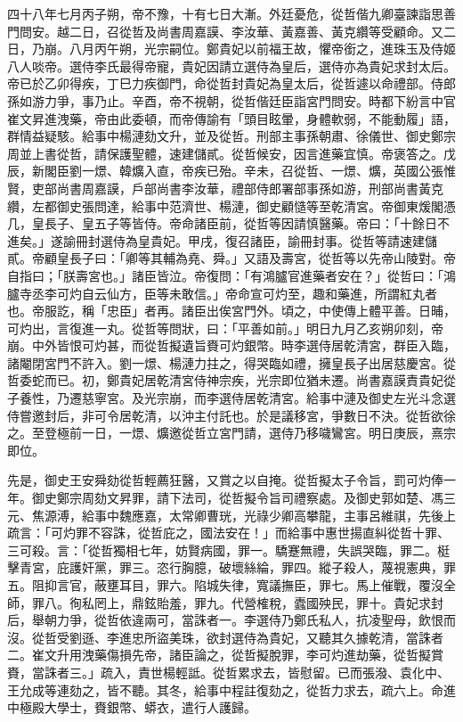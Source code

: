 \begin{pinyinscope}
四十八年七月丙子朔，帝不豫，十有七日大漸。外廷憂危，從哲偕九卿臺諫詣思善門問安。越二日，召從哲及尚書周嘉謨、李汝華、黃嘉善、黃克纘等受顧命。又二日，乃崩。八月丙午朔，光宗嗣位。鄭貴妃以前福王故，懼帝銜之，進珠玉及侍姬八人啖帝。選侍李氏最得帝寵，貴妃因請立選侍為皇后，選侍亦為貴妃求封太后。帝已於乙卯得疾，丁巳力疾御門，命從哲封貴妃為皇太后，從哲遽以命禮部。侍郎孫如游力爭，事乃止。辛酉，帝不視朝，從哲偕廷臣詣宮門問安。時都下紛言中官崔文昇進洩藥，帝由此委頓，而帝傳諭有「頭目眩暈，身體軟弱，不能動履」語，群情益疑駭。給事中楊漣劾文升，並及從哲。刑部主事孫朝肅、徐儀世、御史鄭宗周並上書從哲，請保護聖體，速建儲貳。從哲候安，因言進藥宜慎。帝褒答之。戊辰，新閣臣劉一燝、韓爌入直，帝疾已殆。辛未，召從哲、一燝、爌，英國公張惟賢，吏部尚書周嘉謨，戶部尚書李汝華，禮部侍郎署部事孫如游，刑部尚書黃克纘，左都御史張問達，給事中范濟世、楊漣，御史顧慥等至乾清宮。帝御東煖閣憑几，皇長子、皇五子等皆侍。帝命諸臣前，從哲等因請慎醫藥。帝曰：「十餘日不進矣。」遂諭冊封選侍為皇貴妃。甲戌，復召諸臣，諭冊封事。從哲等請速建儲貳。帝顧皇長子曰：「卿等其輔為堯、舜。」又語及壽宮，從哲等以先帝山陵對。帝自指曰；「朕壽宮也。」諸臣皆泣。帝復問：「有鴻臚官進藥者安在？」從哲曰：「鴻臚寺丞李可灼自云仙方，臣等未敢信。」帝命宣可灼至，趣和藥進，所謂紅丸者也。帝服訖，稱「忠臣」者再。諸臣出俟宮門外。頃之，中使傳上體平善。日晡，可灼出，言復進一丸。從哲等問狀，曰：「平善如前。」明日九月乙亥朔卯刻，帝崩。中外皆恨可灼甚，而從哲擬遺旨賚可灼銀幣。時李選侍居乾清宮，群臣入臨，諸閹閉宮門不許入。劉一燝、楊漣力拄之，得哭臨如禮，擁皇長子出居慈慶宮。從哲委蛇而已。初，鄭貴妃居乾清宮侍神宗疾，光宗即位猶未遷。尚書嘉謨責貴妃從子養性，乃遷慈寧宮。及光宗崩，而李選侍居乾清宮。給事中漣及御史左光斗念選侍嘗邀封后，非可令居乾清，以沖主付託也。於是議移宮，爭數日不決。從哲欲徐之。至登極前一日，一燝、爌邀從哲立宮門請，選侍乃移噦鸞宮。明日庚辰，熹宗即位。

先是，御史王安舜劾從哲輕薦狂醫，又賞之以自掩。從哲擬太子令旨，罰可灼俸一年。御史鄭宗周劾文昇罪，請下法司，從哲擬令旨司禮察處。及御史郭如楚、馮三元、焦源溥，給事中魏應嘉，太常卿曹珖，光祿少卿高攀龍，主事呂維祺，先後上疏言：「可灼罪不容誅，從哲庇之，國法安在！」而給事中惠世揚直糾從哲十罪、三可殺。言：「從哲獨相七年，妨賢病國，罪一。驕蹇無禮，失誤哭臨，罪二。梃擊青宮，庇護奸黨，罪三。恣行胸臆，破壞絲綸，罪四。縱子殺人，蔑視憲典，罪五。阻抑言官，蔽壅耳目，罪六。陷城失律，寬議撫臣，罪七。馬上催戰，覆沒全師，罪八。徇私罔上，鼎鉉貽羞，罪九。代營榷稅，蠹國殃民，罪十。貴妃求封后，舉朝力爭，從哲依違兩可，當誅者一。李選侍乃鄭氏私人，抗凌聖母，飲恨而沒。從哲受劉遜、李進忠所盜美珠，欲封選侍為貴妃，又聽其久據乾清，當誅者二。崔文升用洩藥傷損先帝，諸臣論之，從哲擬脫罪，李可灼進劫藥，從哲擬賞賚，當誅者三。」疏入，責世楊輕詆。從哲累求去，皆慰留。已而張潑、袁化中、王允成等連劾之，皆不聽。其冬，給事中程註復劾之，從哲力求去，疏六上。命進中極殿大學士，賚銀幣、蟒衣，遣行人護歸。


\end{pinyinscope}
